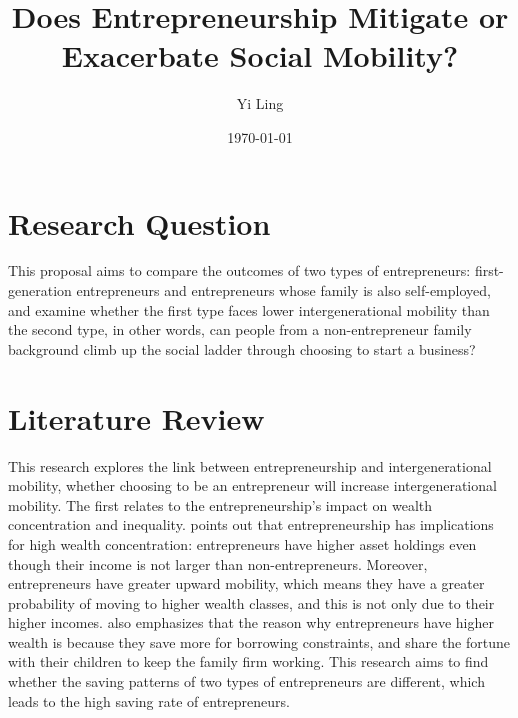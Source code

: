 



\title{\Large \textbf{Does Entrepreneurship Mitigate or Exacerbate Social Mobility? }}
\author{Yi Ling}

\date{\today}

\maketitle

\thispagestyle{empty} 
\doublespacing
\thispagestyle{empty} 

\section{Research Question}
This proposal aims to compare the outcomes of two types of entrepreneurs:  first-generation entrepreneurs and entrepreneurs whose family is also self-employed, and examine whether the first type faces lower intergenerational mobility than the second type, in other words, can people from a non-entrepreneur family background climb up the social ladder through choosing to start a business?

\section{Literature Review}
This research explores the link between entrepreneurship and intergenerational mobility, whether choosing to be an entrepreneur will increase intergenerational mobility. The first relates to the entrepreneurship's impact on wealth concentration and inequality. \citet{quadrini1999importance} points out that entrepreneurship has implications for high wealth concentration: entrepreneurs have higher asset holdings even though their income is not larger than non-entrepreneurs. Moreover, entrepreneurs have greater upward mobility, which means they have a greater probability of moving to higher wealth classes, and this is not only due to their higher incomes. \citet{cagetti2006entrepreneurship} also emphasizes that the reason why entrepreneurs have higher wealth is because they save more for borrowing constraints, and share the fortune with their children to keep the family firm working. This research aims to find whether the saving patterns of two types of entrepreneurs are different, which leads to the high saving rate of entrepreneurs.


